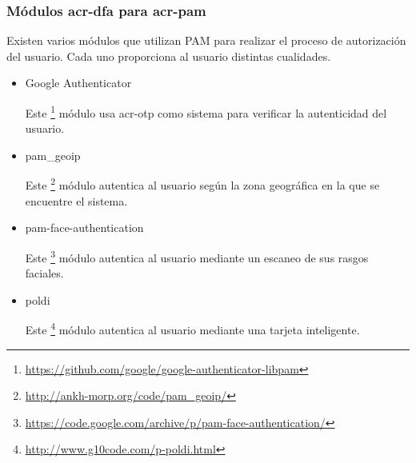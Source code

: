 \documentclass[twoside, titlepage, 12pt, a4paper]{article}
\begin{document}
{\subsubsection{Módulos \gls{acr-dfa} para \gls{acr-pam}}
Existen varios módulos que utilizan PAM para realizar el proceso de autorización del usuario. Cada uno proporciona al usuario distintas cualidades.
\begin{itemize}
	\item{Google Authenticator}\par
	Este \footnote{\url{https://github.com/google/google-authenticator-libpam}} módulo usa \gls{acr-otp} como sistema para verificar la autenticidad del usuario.
	\item{pam\_geoip}\par
	Este \footnote{\url{http://ankh-morp.org/code/pam_geoip/}} módulo autentica al usuario según la zona geográfica en la que se encuentre el sistema.
	\item{pam-face-authentication} \par
	Este \footnote{\url{https://code.google.com/archive/p/pam-face-authentication/}} módulo autentica al usuario mediante un escaneo de sus rasgos faciales.
	\item{poldi} \par
	Este \footnote{\url{http://www.g10code.com/p-poldi.html}} módulo autentica al usuario mediante una tarjeta inteligente.
\end{itemize}
}
\end{document}
